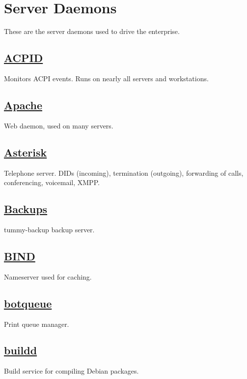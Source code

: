 %
%
%
%
%

\section{Server Daemons}
These are the server daemons used to drive the enterprise.

\subsection{\href{http://sourceforge.net/projects/acpid2/}{ACPID}}
Monitors ACPI events. Runs on nearly all servers and workstations.

\subsection{\href{http://httpd.apache.org/}{Apache}}
Web daemon, used on many servers.

\subsection{\href{http://www.asterisk.org}{Asterisk}}
Telephone server. DIDs (incoming), termination (outgoing), forwarding of calls, conferencing,
voicemail, XMPP.

\subsection{\href{https://github.com/tummy-dot-com/tummy-backup}{Backups}}
tummy-backup backup server.

\subsection{\href{http://www.isc.org/}{BIND}}
Nameserver used for caching.

\subsection{\href{http://www.botqueue.org/}{botqueue}}
Print queue manager.

\subsection{\href{http://www.debian.org/}{buildd}}
Build service for compiling Debian packages.

